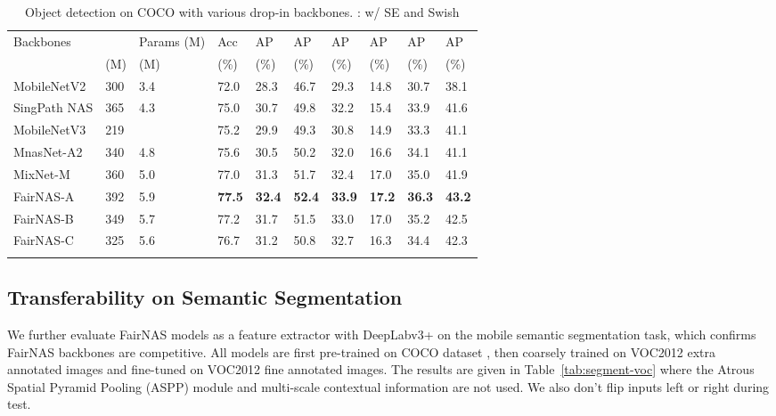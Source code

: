 \documentclass[10pt,twocolumn,letterpaper]{article}
\theoremstyle{definition}
\begin{document}
\begin{table}[ht]
	\setlength{\tabcolsep}{1pt}
	\small
	\centering
\begin{tabular}{*{2}{|l}H*{7}{l|}}
\hline
			Backbones &   & Params (M) &Acc    & AP & AP & AP & AP & AP & AP \\
& (M) & (M) & (\%) &(\%) & (\%)& (\%)&(\%) &(\%) &(\%) \\
			\hline MobileNetV2 \cite{sandler2018mobilenetv2} & 300 & 3.4& 72.0 & 28.3 & 46.7 & 29.3 & 14.8 & 30.7 & 38.1\\
			SingPath NAS \cite{stamoulis2019single} & 365 & 4.3 & 75.0 & 30.7 & 49.8 & 32.2 & 15.4 &33.9 & 41.6\\
MobileNetV3 \cite{howard2019searching} & 219 & & 75.2& 29.9 & 49.3 & 30.8 & 14.9 & 33.3 & 41.1\\
			MnasNet-A2 \cite{tan2018mnasnet} & 340& 4.8 & 75.6 & 30.5 & 50.2 & 32.0 & 16.6 & 34.1 & 41.1\\
MixNet-M \cite{tan2020mixconv} & 360 & 5.0 & 77.0 & 31.3& 51.7 & 32.4& 17.0 & 35.0 & 41.9   \\
			FairNAS-A & 392 & 5.9 & \textbf{77.5} & \textbf{32.4} & \textbf{52.4} & \textbf{33.9} & \textbf{17.2} & \textbf{36.3} & \textbf{43.2}\\
			FairNAS-B & 349 & 5.7 & 77.2 & 31.7 & 51.5 & 33.0 & 17.0 & 35.2 & 42.5\\
			FairNAS-C &325 & 5.6& 76.7& 31.2 & 50.8 & 32.7 & 16.3 & 34.4 & 42.3\\
			\hline \noalign{\smallskip}
		\end{tabular}
		\caption{Object detection on COCO with various drop-in backbones. : w/ SE and Swish}
		\label{table:fairnas-coco-retina}
\end{table}
\setlength{\tabcolsep}{1.4pt}

\subsection{Transferability on Semantic Segmentation}

We further evaluate FairNAS models as a feature extractor with DeepLabv3+\cite{deeplabv3plus2018} on the mobile semantic segmentation task, which confirms FairNAS backbones are competitive. All models are first pre-trained on COCO dataset \cite{lin2014coco}, then coarsely trained on VOC2012 \cite{pascal-voc-2012} extra annotated images and fine-tuned on VOC2012 fine annotated images. The results are given in Table~\ref{tab:segment-voc} where  the Atrous Spatial Pyramid Pooling (ASPP) module and multi-scale contextual information are not used. We also don't flip inputs left or right during test.
\end{document}
